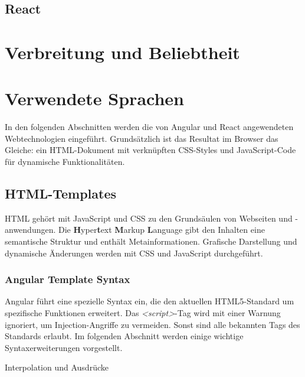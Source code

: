 \subsection{React}



\section{Verbreitung und Beliebtheit}

\section{Verwendete Sprachen}
In den folgenden Abschnitten werden die von Angular und React angewendeten Webtechnologien eingeführt. Grundsätzlich ist das Resultat im Browser das Gleiche: ein HTML-Dokument mit verknüpften CSS-Styles und JavaScript-Code für dynamische Funktionalitäten. 

\subsection{HTML-Templates}
HTML gehört mit JavaScript und CSS zu den Grundsäulen von Webseiten und -anwendungen. Die \textbf{H}yper\textbf{t}ext \textbf{M}arkup \textbf{L}anguage gibt den Inhalten eine semantische Struktur und enthält Metainformationen. Grafische Darstellung und dynamische Änderungen werden mit CSS und JavaScript durchgeführt. 

\subsubsection{Angular Template Syntax}
Angular führt eine spezielle Syntax ein, die den aktuellen HTML5-Standard um spezifische Funktionen erweitert. Das \textit{<script>}-Tag wird mit einer Warnung ignoriert, um Injection-Angriffe zu vermeiden. Sonst sind alle bekannten Tags des Standards erlaubt. Im folgenden Abschnitt werden einige wichtige Syntaxerweiterungen vorgestellt.

Interpolation und Ausdrücke

